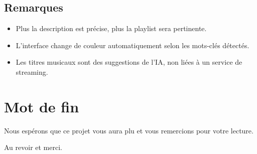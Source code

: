 \documentclass[a4paper, 12pt, twoside]{article}
\begin{document}
\subsection*{Remarques}

\begin{itemize}
    \item Plus la description est précise, plus la playlist sera pertinente.
    \item L'interface change de couleur automatiquement selon les mots-clés détectés.
    \item Les titres musicaux sont des suggestions de l'IA, non liées à un service de streaming.
\end{itemize}
\newpage
\section*{Mot de fin}

Nous espérons que ce projet vous aura plu et vous remercions pour votre lecture.

Au revoir et merci.
\end{document}
